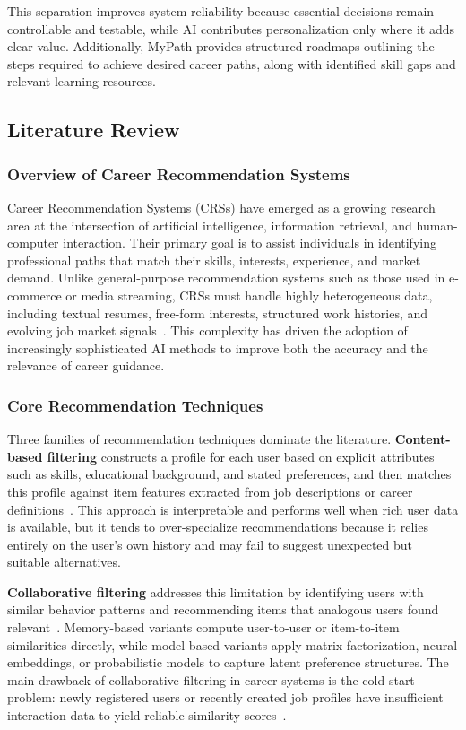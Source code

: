 \documentclass[12pt,a4paper]{article}
\begin{document}
This separation improves system reliability because essential decisions remain controllable and testable, while AI contributes personalization only where it adds clear value. Additionally, MyPath provides structured roadmaps outlining the steps required to achieve desired career paths, along with identified skill gaps and relevant learning resources.

\subsection{Literature Review}

\subsubsection*{Overview of Career Recommendation Systems}

Career Recommendation Systems (CRSs) have emerged as a growing research area at the intersection of artificial intelligence, information retrieval, and human-computer interaction. Their primary goal is to assist individuals in identifying professional paths that match their skills, interests, experience, and market demand. Unlike general-purpose recommendation systems such as those used in e-commerce or media streaming, CRSs must handle highly heterogeneous data, including textual resumes, free-form interests, structured work histories, and evolving job market signals~\cite{jobrec_arxiv2021}. This complexity has driven the adoption of increasingly sophisticated AI methods to improve both the accuracy and the relevance of career guidance.

\subsubsection*{Core Recommendation Techniques}

Three families of recommendation techniques dominate the literature. \textbf{Content-based filtering} constructs a profile for each user based on explicit attributes such as skills, educational background, and stated preferences, and then matches this profile against item features extracted from job descriptions or career definitions~\cite{ndolo2023job}. This approach is interpretable and performs well when rich user data is available, but it tends to over-specialize recommendations because it relies entirely on the user's own history and may fail to suggest unexpected but suitable alternatives.

\textbf{Collaborative filtering} addresses this limitation by identifying users with similar behavior patterns and recommending items that analogous users found relevant~\cite{maan2018hybrid}. Memory-based variants compute user-to-user or item-to-item similarities directly, while model-based variants apply matrix factorization, neural embeddings, or probabilistic models to capture latent preference structures. The main drawback of collaborative filtering in career systems is the cold-start problem: newly registered users or recently created job profiles have insufficient interaction data to yield reliable similarity scores~\cite{springer2022job}.
\end{document}
